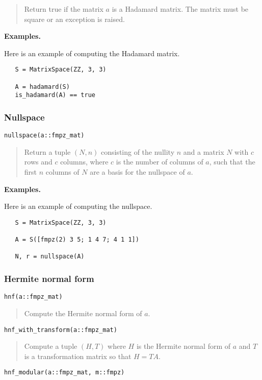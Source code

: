 \documentclass[a4paper,10pt]{article}
\newcommand{\desc}[1]{\vspace{-3mm}\begin{quote}#1\end{quote}}
\begin{document}
{{\desc{Return true if the matrix $a$ is a Hadamard matrix. The matrix must be square
or an exception is raised.}

\textbf{Examples.}

Here is an example of computing the Hadamard matrix.

\begin{lstlisting}
   S = MatrixSpace(ZZ, 3, 3)

   A = hadamard(S)
   is_hadamard(A) == true
\end{lstlisting}

\subsubsection{Nullspace}

\begin{lstlisting}
nullspace(a::fmpz_mat)
\end{lstlisting}

\desc{Return a tuple $(N, n)$ consisting of the nullity $n$ and a matrix $N$ with
$c$ rows and $c$ columns, where $c$ is the number of columns of $a$, such that 
the first $n$ columns of $N$ are a basis for the nullspace of $a$.}

\textbf{Examples.}

Here is an example of computing the nullspace.

\begin{lstlisting}
   S = MatrixSpace(ZZ, 3, 3)

   A = S([fmpz(2) 3 5; 1 4 7; 4 1 1])
   
   N, r = nullspace(A)
\end{lstlisting}

\subsubsection{Hermite normal form}

\begin{lstlisting}
hnf(a::fmpz_mat)
\end{lstlisting}

\desc{Compute the Hermite normal form of $a$.}

\begin{lstlisting}
hnf_with_transform(a::fmpz_mat)
\end{lstlisting}

\desc{Compute a tuple $(H, T)$ where $H$ is the Hermite normal form of $a$
and $T$ is a transformation matrix so that $H = TA$.}

\begin{lstlisting}
hnf_modular(a::fmpz_mat, m::fmpz)
\end{lstlisting}

}}
\end{document}
